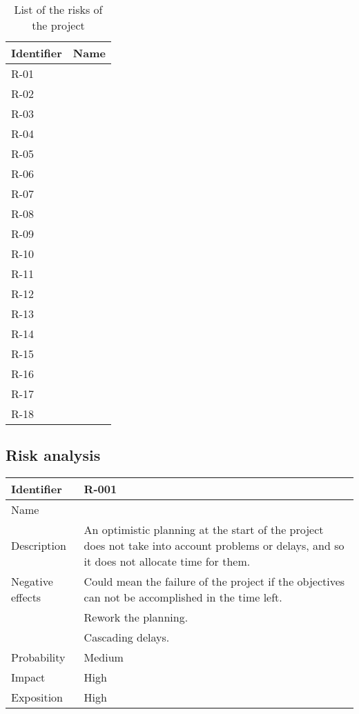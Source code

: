 \begin{table}[H]
	\begin{tabularx}{\textwidth}{|l|X|}
		\hline
		\rowcolor{gray!30}
		Identifier & Name \\ \hline
		R-01 & \Runo \\ \hline
		R-02 & \Rdos \\ \hline
		R-03 & \Rtres \\ \hline
		R-04 & \Rcuatro \\ \hline
		R-05 & \Rcinco \\ \hline
		R-06 & \Rseis \\ \hline
		R-07 & \Rsiete \\ \hline
		R-08 & \Rocho \\ \hline
		R-09 & \Rnueve \\ \hline
		R-10 & \Rdiez \\ \hline
		R-11 & \Ronce \\ \hline
		R-12 & \Rdoce \\ \hline
		R-13 & \Rtrece \\ \hline
		R-14 & \Rcatorce \\ \hline
		R-15 & \Rquince \\ \hline
		R-16 & \Rdieciseis \\ \hline
		R-17 & \Rdiecisiete \\ \hline
		R-18 & \Rdieciocho \\ \hline
	\end{tabularx}
	\caption{List of the risks of the project}
\end{table}





\subsection{Risk analysis}


\begin{table}[H]
	\begin{tabularx}{\textwidth}{|l|X|}
		\hline
		\rowcolor{gray!30}
		Identifier & \textbf{R-001} \\ \hline
		Name & \Runo \\ \hline
		Description & An optimistic planning at the start of the project does not take into account problems or delays, and so it does not allocate time for them. \\ \hline
		Negative effects
			& Could mean the failure of the project if the objectives can not be accomplished in the time left. \\
			& Rework the planning. \\
			& Cascading delays.\\ \hline
		Probability & Medium\\ \hline
		Impact &  High\\ \hline
		Exposition &  High\\ \hline
	\end{tabularx}
\end{table}

